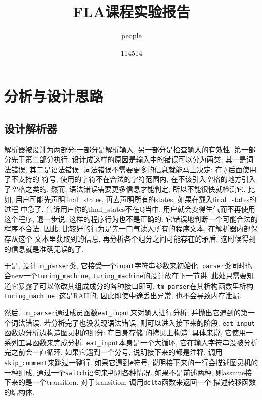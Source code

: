 \documentclass[utf8]{article}
\title{\textbf{FLA课程实验报告}}
\author{people}
\date{114514}
\begin{document}
\maketitle
\newpage
\tableofcontents
\newpage
\section[分析与设计]{分析与设计思路}
\subsection[解析器]{设计解析器}
解析器被设计为两部分:一部分是解析输入, 另一部分是检查输入的有效性. 第一部分先于第二部分执行. 设计成这样的原因是输入中的错误可以分为两类, 其一是词法错误, 其二是语法错误. 词法错误不需要更多的信息就能马上决定: 在\#后面使用了不支持的
符号, 使用的字符不在合法的字符范围内, 在不该引入空格的地方引入了空格之类的. 然而, 语法错误需要更多信息才能判定, 所以不能很快就检测它. 比如, 用户可能先声明final\_states, 再去声明所有的states, 如果在载入final\_states的过程
中急了, 告诉用户你的final\_states不在Q当中, 用户就会变得生气而不再使用这个程序, 退一步说, 这样的程序行为也不是正确的: 它错误地判断一个可能合法的程序不合法. 因此, 比较好的行为是先一口气读入所有的程序文本, 在解析器内部保存从这个
文本里获取到的信息, 再分析各个组分之间可能存在的矛盾, 这时候得到的信息就是准确无误的了. 

于是, 设计\verb|tm_parser|类, 它接受一个\verb|input|字符串参数来初始化. \verb|parser|类同时也会new一个\verb|turing_machine|, 
\verb|turing_machine|的设计放在下一节讲, 此处只需要知道它暴露了可以修改其组成成分的各种接口即可. \verb|tm_parser|在其析构函数里析构\verb|turing_machine|. 这是RAII的, 因此即使中途丢出异常, 也不会导致内存泄漏.

然后, \verb|tm_parser|通过成员函数\verb|eat_input|来对输入进行分析, 并抛出它遇到的第一个词法错误. 若分析完了也没发现语法错误, 则可以进入接下来的阶段. \verb|eat_input|函数边分析边构造图灵机的组分: 在自身存储
的拷贝上构造. 具体来说, 它使用一系列工具函数来完成分析. \verb|eat_input|本身是一个大循环, 它在输入字符串没被分析完之前会一直循环, 如果它遇到一个分号, 说明接下来的都是注释, 调用\verb|skip_comment|来跳过一整行. 
如果它遇到\verb|#|符号, 说明接下来的一行会描述图灵机的一种组成, 通过一个\verb|switch|语句来判别各种情况. 如果不是前述两种, 则assume接下来的是一个transition. 对于transition, 调用\verb|delta|函数来返回一个
描述转移函数的结构体. 
\end{document}
